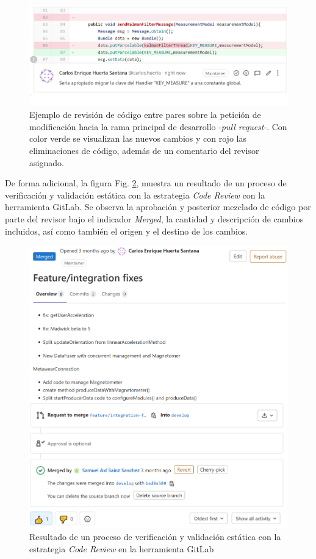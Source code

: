 \begin{figure}[H]
\centering
\includegraphics[width=\textwidth]{TESIS/imagenes/chap06/pr-comments.PNG}
\caption{Ejemplo de revisión de código entre pares sobre la petición de modificación hacia la rama principal de desarrollo -\textit{pull request}-. Con color verde se visualizan las nuevos cambios y con rojo las eliminaciones de código, además de un comentario del revisor asignado. }
\label{FIG:pr-review}
\end{figure}

\noindent De forma adicional, la figura Fig. \ref{FIG:pr-result}, muestra un resultado de un proceso de verificación y validación estática con la estrategia \textit{Code Review} con la herramienta GitLab. Se observa la aprobación y posterior mezclado de código por parte del revisor bajo el indicador \textit{Merged}, la cantidad y descripción de cambios incluidos, así como también el origen y el destino de los cambios.

\begin{figure}[H]
\centering
\includegraphics[width=\textwidth]{TESIS/imagenes/chap06/pr.PNG}
\caption{Resultado de un proceso de verificación y validación estática con la estrategia \textit{Code Review} en la herramienta GitLab}
\label{FIG:pr-result}
\end{figure}

